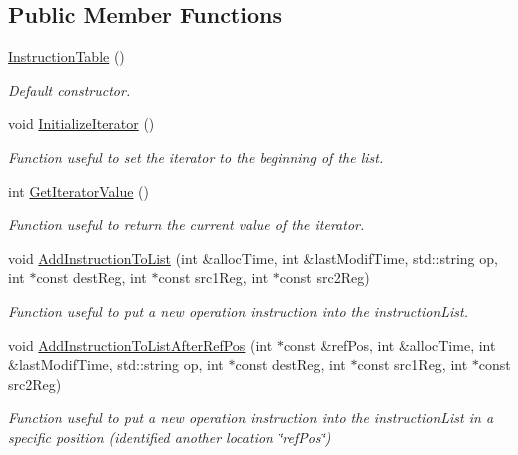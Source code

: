 \subsection*{Public Member Functions}
\begin{DoxyCompactItemize}
\item 
\hyperlink{classoctantis_1_1InstructionTable_a59d38f5661dff5c938a8ee4e85213f27}{Instruction\+Table} ()
\begin{DoxyCompactList}\small\item\em Default constructor. \end{DoxyCompactList}\item 
void \hyperlink{classoctantis_1_1InstructionTable_a96a6fb833e0886548ae75770bad8f546}{Initialize\+Iterator} ()
\begin{DoxyCompactList}\small\item\em Function useful to set the iterator to the beginning of the list. \end{DoxyCompactList}\item 
int \hyperlink{classoctantis_1_1InstructionTable_a17258726fc044c5fbc3a92bc0466b676}{Get\+Iterator\+Value} ()
\begin{DoxyCompactList}\small\item\em Function useful to return the current value of the iterator. \end{DoxyCompactList}\item 
void \hyperlink{classoctantis_1_1InstructionTable_a060292d882ceac0db27958a2ab0c52e7}{Add\+Instruction\+To\+List} (int \&alloc\+Time, int \&last\+Modif\+Time, std\+::string op, int $\ast$const dest\+Reg, int $\ast$const src1\+Reg, int $\ast$const src2\+Reg)
\begin{DoxyCompactList}\small\item\em Function useful to put a new operation instruction into the instruction\+List. \end{DoxyCompactList}\item 
void \hyperlink{classoctantis_1_1InstructionTable_a54996f84d677ac20e1edec8682aabcea}{Add\+Instruction\+To\+List\+After\+Ref\+Pos} (int $\ast$const \&ref\+Pos, int \&alloc\+Time, int \&last\+Modif\+Time, std\+::string op, int $\ast$const dest\+Reg, int $\ast$const src1\+Reg, int $\ast$const src2\+Reg)
\begin{DoxyCompactList}\small\item\em Function useful to put a new operation instruction into the instruction\+List in a specific position (identified another location \char`\"{}ref\+Pos\char`\"{}) \end{DoxyCompactList}\item 

\end{DoxyCompactItemize}
